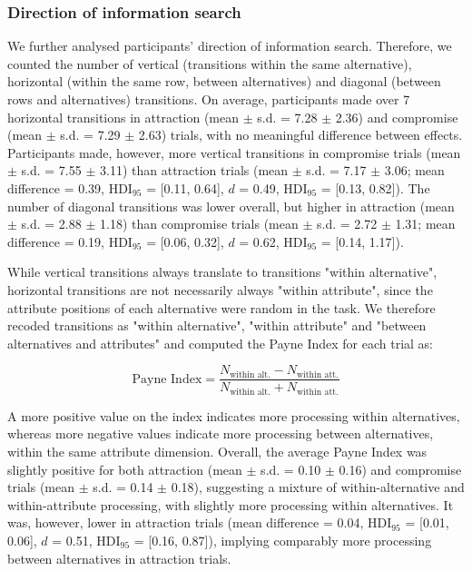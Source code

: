 \documentclass[11pt, a4paper]{article}
\begin{document}
\begin{refsection}
\subsubsection*{Direction of information search}
We further analysed participants’ direction of information search. Therefore, we counted the number of vertical (transitions within the same alternative), horizontal (within the same row, between alternatives) and diagonal (between rows and alternatives) transitions. On average, participants made over 7 horizontal transitions in attraction (mean $\pm$ s.d. = 7.28 $\pm$ 2.36) and compromise (mean $\pm$ s.d. = 7.29 $\pm$ 2.63) trials, with no meaningful difference between effects. Participants made, however, more vertical transitions in compromise trials (mean $\pm$ s.d. = 7.55 $\pm$ 3.11) than attraction trials (mean $\pm$ s.d. = 7.17 $\pm$ 3.06; mean difference = 0.39, HDI$_{95}$  = [0.11, 0.64], $d$ = 0.49, HDI$_{95}$  = [0.13, 0.82]). The number of diagonal transitions was lower overall, but higher in attraction (mean $\pm$ s.d. = 2.88 $\pm$ 1.18) than compromise trials (mean $\pm$ s.d. = 2.72 $\pm$ 1.31; mean difference = 0.19, HDI$_{95}$  = [0.06, 0.32], $d$ = 0.62, HDI$_{95}$  = [0.14, 1.17]).

While vertical transitions always translate to transitions "within alternative", horizontal transitions are not necessarily always "within attribute", since the attribute positions of each alternative were random in the task. We therefore recoded transitions as "within alternative", "within attribute" and "between alternatives and attributes" and computed the Payne Index \autocite{payne1976TaskComplexityContingent} for each trial as:

\begin{equation}
    \text{Payne Index} = \frac{N_{\text{within~alt.}} - N_{\text{within~att.}}}{N_{\text{within~alt.}} + N_{\text{within~att.}}}
\end{equation}

A more positive value on the index indicates more processing within alternatives, whereas more negative values indicate more processing between alternatives, within the same attribute dimension. Overall, the average Payne Index was slightly positive for both attraction (mean $\pm$ s.d. = 0.10 $\pm$ 0.16) and compromise trials (mean $\pm$ s.d. = 0.14 $\pm$ 0.18), suggesting a mixture of within-alternative and within-attribute processing, with slightly more processing within alternatives. It was, however, lower in attraction trials (mean difference = 0.04, HDI$_{95}$  = [0.01, 0.06], $d$ = 0.51, HDI$_{95}$  = [0.16, 0.87]), implying comparably more processing between alternatives in attraction trials.
\clearpage


\end{refsection}
\end{document}

